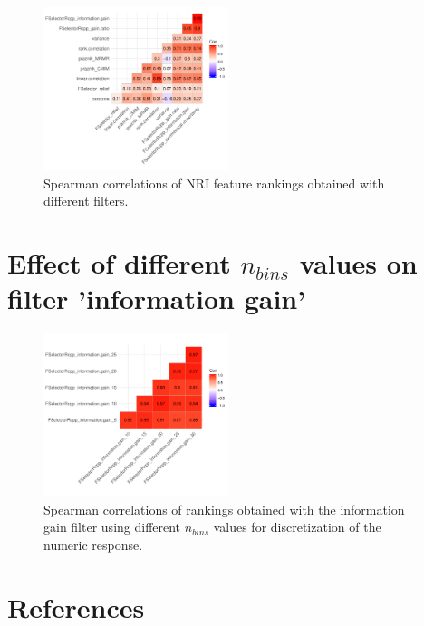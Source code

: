 \documentclass[letterpaper, peerreview, draftcls]{IEEEtran}
\begin{document}
\begin{figure} [ht]
	\begin{center}
		\includegraphics[width=0.48\textwidth] {correlation-filter-nri-1.pdf}
		\caption{Spearman correlations of NRI feature rankings obtained with different filters.}\label{fig:correlation-filters}
	\end{center}
\end{figure}

\section{Effect of different \texorpdfstring{\(n_{bins}\)}{nbins} values on filter 'information gain'}

\begin{figure} [ht]
	\begin{center}
		\includegraphics[width=0.48\textwidth] {correlation-nbins-1.pdf}
		\caption{Spearman correlations of rankings obtained with the information gain filter using different \texttt{\(n_{bins}\)} values for discretization of the numeric response.}\label{fig:correlation-nbins}
	\end{center}
\end{figure}

\pagebreak




\section*{References}
\end{document}
